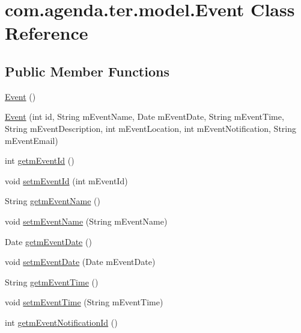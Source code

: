 \hypertarget{classcom_1_1agenda_1_1ter_1_1model_1_1_event}{\section{com.\-agenda.\-ter.\-model.\-Event Class Reference}
\label{classcom_1_1agenda_1_1ter_1_1model_1_1_event}
}
\subsection*{Public Member Functions}
\begin{DoxyCompactItemize}
\item 
\hyperlink{classcom_1_1agenda_1_1ter_1_1model_1_1_event_a34de167094aa25f4fd6c42d001bb3c75}{Event} ()
\item 
\hyperlink{classcom_1_1agenda_1_1ter_1_1model_1_1_event_a339a0143bc791fc75fe221964a0174f2}{Event} (int id, String m\-Event\-Name, Date m\-Event\-Date, String m\-Event\-Time, String m\-Event\-Description, int m\-Event\-Location, int m\-Event\-Notification, String m\-Event\-Email)
\item 
int \hyperlink{classcom_1_1agenda_1_1ter_1_1model_1_1_event_abe3209ee88fafe9da582056f1025e9ac}{getm\-Event\-Id} ()
\item 
void \hyperlink{classcom_1_1agenda_1_1ter_1_1model_1_1_event_a485ba3dc14452d95464f13e70c3effc6}{setm\-Event\-Id} (int m\-Event\-Id)
\item 
String \hyperlink{classcom_1_1agenda_1_1ter_1_1model_1_1_event_ad3c05b80bf397774330540283248a230}{getm\-Event\-Name} ()
\item 
void \hyperlink{classcom_1_1agenda_1_1ter_1_1model_1_1_event_a7d72f1f9a035f2199ffc23866a6e0a8f}{setm\-Event\-Name} (String m\-Event\-Name)
\item 
Date \hyperlink{classcom_1_1agenda_1_1ter_1_1model_1_1_event_ae9ce097fc52e397864d28f07919c9ff6}{getm\-Event\-Date} ()
\item 
void \hyperlink{classcom_1_1agenda_1_1ter_1_1model_1_1_event_ac400d2808da6a3ac75a34f7571c9a673}{setm\-Event\-Date} (Date m\-Event\-Date)
\item 
String \hyperlink{classcom_1_1agenda_1_1ter_1_1model_1_1_event_a4e219cfcca4e549e8f677695fcc6dd35}{getm\-Event\-Time} ()
\item 
void \hyperlink{classcom_1_1agenda_1_1ter_1_1model_1_1_event_af7e2a6369992a7bbb375d2d44b06621a}{setm\-Event\-Time} (String m\-Event\-Time)
\item 
int \hyperlink{classcom_1_1agenda_1_1ter_1_1model_1_1_event_a0aab95d555443bbc4a8ee291a7191159}{getm\-Event\-Notification\-Id} ()

\end{DoxyCompactItemize}
